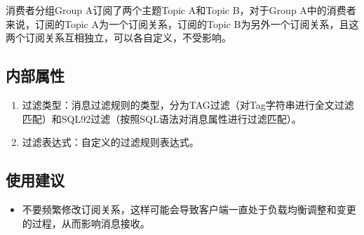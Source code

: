 \documentclass[11pt, a4paper, oneside, fontset=none]{ctexbook}
\begin{document}
消费者分组Group A订阅了两个主题Topic A和Topic B，对于Group A中的消费者来说，订阅的Topic A为一个订阅关系，订阅的Topic B为另外一个订阅关系，且这两个订阅关系互相独立，可以各自定义，不受影响。

\subsection{内部属性}
\begin{enumerate}
  \item 过滤类型：消息过滤规则的类型，分为TAG过滤（对Tag字符串进行全文过滤匹配）和SQL92过滤（按照SQL语法对消息属性进行过滤匹配）。
  \item 过滤表达式：自定义的过滤规则表达式。
\end{enumerate}

\subsection{使用建议}
\begin{itemize}
  \item 不要频繁修改订阅关系，这样可能会导致客户端一直处于负载均衡调整和变更的过程，从而影响消息接收。
\end{itemize}


\end{document}
